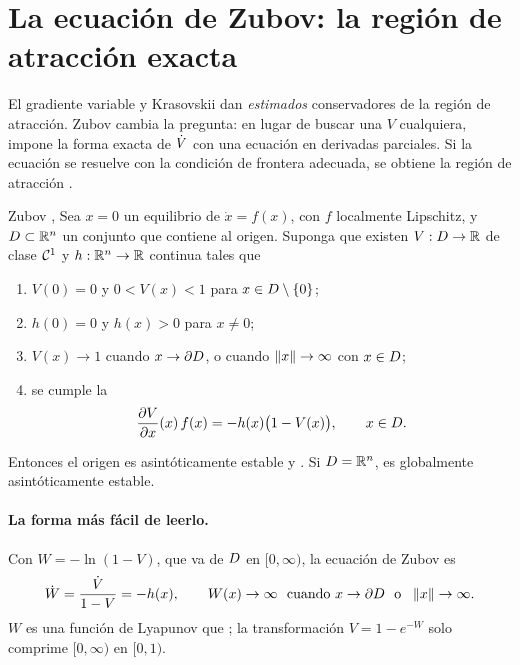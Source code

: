 \section{La ecuación de Zubov: la región de atracción exacta}
\label{sec:iv-zubov}

El gradiente variable y Krasovskii dan \emph{estimados} conservadores de la región de atracción. Zubov cambia la pregunta: en lugar de buscar una $V$ cualquiera, impone la forma exacta de $\dot V$ con una ecuación en derivadas parciales. Si la ecuación se resuelve con la condición de frontera adecuada, se obtiene la región de atracción .

\begin{teorema}[label=thm:iv-zubov]{Zubov \citep{Zub64}, \citep[\S8.2 y ej.~8.10]{Kha02}}
Sea $x=0$ un equilibrio de $\dot x=f(x)$, con $f$ localmente Lipschitz, y $D\subset\mathbb{R}^n$ un conjunto  que contiene al origen. Suponga que existen $V:D\to\mathbb{R}$ de clase $\mathcal{C}^{1}$ y $h:\mathbb{R}^n\to\mathbb{R}$ continua tales que
\begin{enumerate}
  \item[(a)] $V(0)=0$ y $0<V(x)<1$ para $x\in D\setminus\{0\}$;
  \item[(b)] $h(0)=0$ y $h(x)>0$ para $x\neq0$;
  \item[(c)] $V(x)\to1$ cuando $x\to\partial D$, o cuando $\left\lVert x\right\rVert\to\infty$ con $x\in D$;
  \item[(d)] se cumple la 
  \begin{equation}
    \frac{\partial V}{\partial x}(x)\,f(x)=-h(x)\bigl(1-V(x)\bigr),\qquad x\in D .
    \label{eq:iv-zubov}
  \end{equation}
\end{enumerate}
Entonces el origen es asintóticamente estable y . Si $D=\mathbb{R}^n$, es globalmente asintóticamente estable.
\end{teorema}

\paragraph{La forma más fácil de leerlo.} Con $W=-\ln(1-V)$, que va de $D$ en $[0,\infty)$, la ecuación de Zubov es
\begin{equation}
  \dot W=\frac{\dot V}{1-V}=-h(x),\qquad W(x)\to\infty\ \text{ cuando }x\to\partial D\ \text{ o }\ \left\lVert x\right\rVert\to\infty .
  \label{eq:iv-W}
\end{equation}
$W$ es una función de Lyapunov que ; la transformación $V=1-e^{-W}$ solo comprime $[0,\infty)$ en $[0,1)$.

